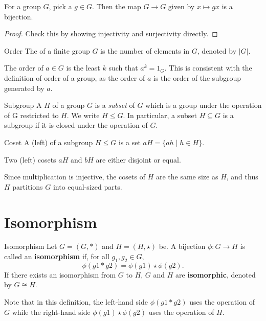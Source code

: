 \begin{proposition}
For a group $G$, pick a $g \in G$. Then the map $G \to G$ given by $x \mapsto gx$ is a bijection.
\end{proposition}
\begin{proof}
Check this by showing injectivity and surjectivity directly.
\end{proof}

\begin{defn}{Order}{}
The  of a finite group $G$ is the number of elements in $G$, denoted by $|G|$.

The order of $a \in G$ is the least $k$ such that $a^k = 1_G$. This is consistent with the definition of order of a group, as the order of $a$ is the order of the subgroup generated by $a$.
\end{defn}

\begin{defn}{Subgroup}{}
A  $H$ of a group $G$ is a \emph{subset} of $G$ which is a group under the operation of G restricted to $H$. We write $H \le G$. In particular, a subset $H\subseteq G$ is a subgroup if it is closed under the operation of $G$.
\end{defn}

\begin{defn}{Coset}{}
A (left)  of a subgroup $H \le G$ is a set $aH = \{ah \mid h \in H\}$.
\end{defn}

Two (left) cosets $aH$ and $bH$ are either disjoint or equal. 

Since multiplication is injective, the cosets of $H$ are the same size as $H$, and thus $H$ partitions $G$ into equal-sized parts.
\pagebreak

\section{Isomorphism}
\begin{defn}{Isomorphism}{}
Let $G = (G,\ast)$ and $H = (H,\star)$ be. A bijection $\phi: G \to H$ is called an \textbf{isomorphism} if, for all $g_1, g_2 \in G$,
\[ \phi(g1 \ast g2) = \phi(g1) \star \phi(g2). \]
If there exists an isomorphism from $G$ to $H$, $G$ and $H$ are \textbf{isomorphic}, denoted by $G \cong H$.
\end{defn}
\begin{remark}
Note that in this definition, the left-hand side $\phi(g1 \ast g2)$ uses the operation of $G$ while the right-hand side $\phi(g1) \star \phi(g2)$ uses the operation of $H$.
\end{remark}

